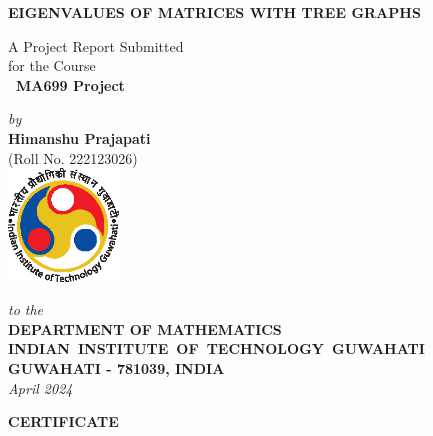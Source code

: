 \documentclass[12pt,a4wide]{report}
\theoremstyle{plain}
\theoremstyle{definition}
\theoremstyle{remark}
\begin{document}


\begin{titlepage}
\enlargethispage{2cm}

\begin{center}

\vspace*{-1cm}

\textbf{\Large EIGENVALUES OF MATRICES WITH TREE GRAPHS}\\[10pt]

\vspace*{2cm}

A Project Report Submitted \\
for the Course \\[1cm]

{\bf\Large\ MA699 Project}\\[.1in]

\vspace*{1cm}

{\large \emph{by}}\\[.5in]
{\large\bf {Himanshu Prajapati}}\\[5pt]
{\large (Roll No. 222123026)}\\[.55in]

\vfill
\includegraphics[height=3cm]{iitg_logo.eps}

\vspace*{0.5cm}

{\em\large to the}\\[10pt]
{\bf\large DEPARTMENT OF MATHEMATICS} \\[5pt]
{\bf\large \mbox{INDIAN INSTITUTE OF TECHNOLOGY GUWAHATI}}\\[5pt]
{\bf\large GUWAHATI - 781039, INDIA}\\[10pt]
{\it\large April 2024}
\end{center}

\end{titlepage}

\clearpage

 \setcounter{page}{2}
\begin{center}
{\Large{\bf{CERTIFICATE}}}
\end{center}
\end{document}
